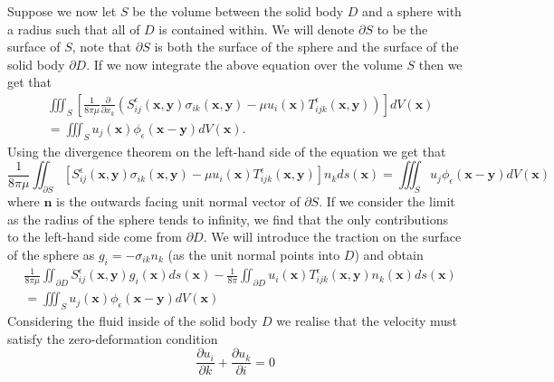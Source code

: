 Suppose we now let $S$ be the volume between the solid body $D$ and a sphere with a radius such that all of $D$ is contained within. We will denote $\partial S$ to be the surface of $S$, note that $\partial S$ is both the surface of the sphere and the surface of the solid body $\partial D$. If we now integrate the above equation over the volume $S$ then we get that
\begin{equation*}
\begin{aligned}
      &\iiint_{S} \left[\frac{1}{8\pi\mu}\frac{\partial}{\partial x_k}(S^\epsilon_{ij}\left(\bm{x}, \bm{y}\right)\sigma_{ik}\left(\bm{x}, \bm{y}\right) - \mu u_i(\bm{x}) T^\epsilon_{ijk}\left(\bm{x}, \bm{y}\right))\right] dV(\bm{x}) \\
      &= \iiint_{S} u_j(\bm{x})\phi_\epsilon(\bm{x}-\bm{y}) dV(\bm{x}).
\end{aligned}
\end{equation*}
Using the divergence theorem on the left-hand side of the equation we get that
\begin{equation*}
  \frac{1}{8\pi\mu}\iint_{\partial S} \left[S^\epsilon_{ij}\left(\bm{x}, \bm{y}\right)\sigma_{ik}\left(\bm{x}, \bm{y}\right) - \mu u_i(\bm{x}) T^\epsilon_{ijk}\left(\bm{x}, \bm{y}\right)\right]n_k ds(\bm{x}) = \iiint_{S} u_j\phi_\epsilon(\bm{x}-\bm{y}) dV(\bm{x})
\end{equation*}
where $\bm{n}$ is the outwards facing unit normal vector of $\partial S$. If we consider the limit as the radius of the sphere tends to infinity, we find that the only contributions to the left-hand side come from $\partial D$. We will introduce the traction on the surface of the sphere as $g_{i} = -\sigma_{ik}n_k$ (as the unit normal points into $D$) and obtain
\begin{equation}
\begin{aligned}
    \label{eq:BIE3}
    &\frac{1}{8\pi\mu}\iint_{\partial D} S^\epsilon_{ij}\left(\bm{x}, \bm{y}\right)g_i(\bm{x}) ds(\bm{x}) - \frac{1}{8\pi}\iint_{\partial D} u_i(\bm{x}) T^\epsilon_{ijk}\left(\bm{x}, \bm{y}\right)n_k(\bm{x}) ds(\bm{x}) \\
    &= \iiint_{S} u_j(\bm{x})\phi_\epsilon(\bm{x}-\bm{y}) dV(\bm{x})
\end{aligned}
\end{equation}
Considering the fluid inside of the solid body $D$ we realise that the velocity must satisfy the zero-deformation condition
\begin{equation*}
  \frac{\partial u_i}{\partial k} + \frac{\partial u_k}{\partial i} = 0
\end{equation*}
